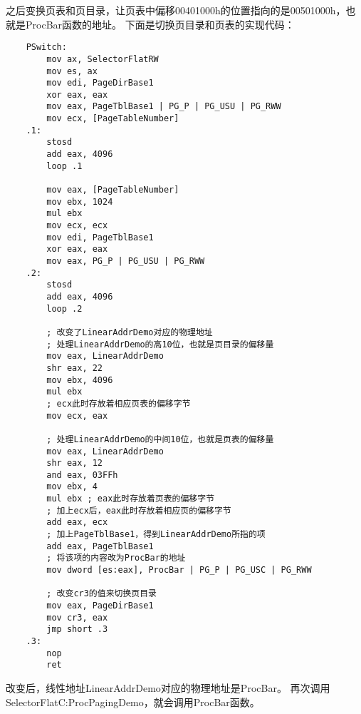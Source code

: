 \documentclass[a4paper,left=2.5cm,right=2.5cm,11pt]{article}
\begin{document}
	之后变换页表和页目录，让页表中偏移00401000h的位置指向的是00501000h，也就是ProcBar函数的地址。
	下面是切换页目录和页表的实现代码：
	\begin{lstlisting}
	PSwitch:
		mov ax, SelectorFlatRW
		mov es, ax
		mov edi, PageDirBase1
		xor eax, eax
		mov eax, PageTblBase1 | PG_P | PG_USU | PG_RWW
		mov ecx, [PageTableNumber]
	.1:
		stosd
		add eax, 4096
		loop .1

		mov eax, [PageTableNumber]
		mov ebx, 1024
		mul ebx
		mov ecx, ecx
		mov edi, PageTblBase1
		xor eax, eax
		mov eax, PG_P | PG_USU | PG_RWW
	.2:
		stosd
		add eax, 4096
		loop .2

		; 改变了LinearAddrDemo对应的物理地址
		; 处理LinearAddrDemo的高10位，也就是页目录的偏移量
		mov eax, LinearAddrDemo
		shr eax, 22
		mov ebx, 4096
		mul ebx 
		; ecx此时存放着相应页表的偏移字节
		mov ecx, eax

		; 处理LinearAddrDemo的中间10位，也就是页表的偏移量
		mov eax, LinearAddrDemo
		shr eax, 12
		and eax, 03FFh
		mov ebx, 4
		mul ebx ; eax此时存放着页表的偏移字节
		; 加上ecx后，eax此时存放着相应页的偏移字节
		add eax, ecx
		; 加上PageTblBase1，得到LinearAddrDemo所指的项
		add eax, PageTblBase1
		; 将该项的内容改为ProcBar的地址
		mov dword [es:eax], ProcBar | PG_P | PG_USC | PG_RWW

		; 改变cr3的值来切换页目录
		mov eax, PageDirBase1
		mov cr3, eax
		jmp short .3
	.3:
		nop
		ret
	\end{lstlisting}

	改变后，线性地址LinearAddrDemo对应的物理地址是ProcBar。
	再次调用SelectorFlatC:ProcPagingDemo，就会调用ProcBar函数。
\end{document}
